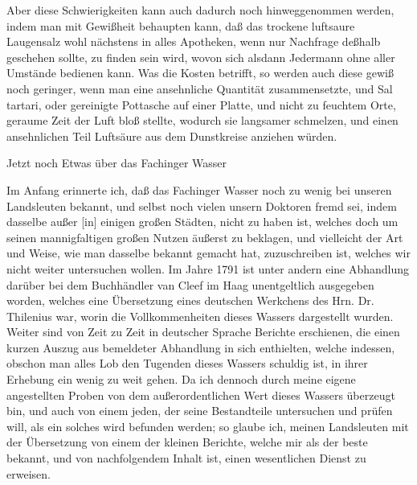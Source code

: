 \documentclass[11pt,a5paper,twoside]{memoir}
\begin{document}
Aber diese Schwierigkeiten kann auch dadurch noch hinweggenommen werden, 
indem man mit Gewißheit behaupten kann, 
daß das trockene luftsaure Laugensalz wohl nächstens in alles Apotheken, 
wenn nur Nachfrage deßhalb geschehen sollte, 
zu finden sein wird, 
wovon sich alsdann Jedermann ohne aller Umstände bedienen kann. 
Was die Kosten betrifft, 
so werden auch diese gewiß noch geringer, 
wenn man eine ansehnliche Quantität zusammensetzte,%
und {\lattext Sal tartari}, 
oder gereinigte Pottasche auf einer Platte, 
und nicht zu feuchtem Orte, 
geraume Zeit der Luft bloß stellte, 
wodurch sie langsamer schmelzen, 
und einen ansehnlichen Teil Luftsäure aus dem Dunstkreise anziehen würden.


\newpage

\begin{center}
\Large Jetzt noch Etwas über das Fachinger Wasser\par
\end{center}

Im Anfang erinnerte ich, 
daß das Fachinger Wasser noch zu wenig bei unseren Landsleuten bekannt, 
und selbst noch vielen unsern Doktoren fremd sei, 
indem dasselbe außer [in] einigen großen Städten, nicht zu haben ist, 
welches doch um seinen mannigfaltigen großen Nutzen äußerst zu beklagen, 
und vielleicht der Art und Weise, 
wie man dasselbe bekannt gemacht hat, 
zuzuschreiben ist, welches wir nicht weiter untersuchen wollen. 
Im Jahre 1791 ist unter andern eine Abhandlung darüber 
bei dem Buchhändler van Cleef im Haag%
unentgeltlich ausgegeben worden, 
welches eine Übersetzung eines deutschen Werkchens 
des Hrn. Dr. Thilenius war, 
worin die Vollkommenheiten dieses Wassers dargestellt wurden. 
Weiter sind von Zeit zu Zeit in deutscher Sprache Berichte erschienen, 
die einen kurzen Auszug aus bemeldeter Abhandlung in sich enthielten, 
welche indessen, 
obschon man alles Lob den Tugenden dieses Wassers schuldig ist, 
in ihrer Erhebung ein wenig zu weit gehen. 
Da ich dennoch durch meine eigene angestellten Proben 
von dem außerordentlichen Wert dieses Wassers überzeugt bin, 
und auch von einem jeden, 
der seine Bestandteile untersuchen und prüfen will, 
als ein solches wird befunden werden; 
so glaube ich, 
meinen Landsleuten mit der Übersetzung von einem der kleinen Berichte, 
welche mir als der beste bekannt, 
und von nachfolgendem Inhalt ist, 
einen wesentlichen Dienst zu erweisen.
\end{document}
